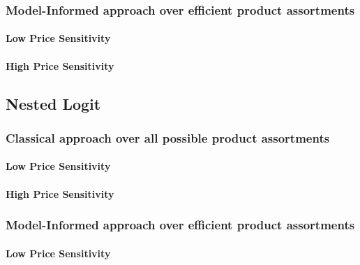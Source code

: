 

\subsubsection{Model-Informed approach over efficient product assortments}

\paragraph{Low Price Sensitivity}



\paragraph{High Price Sensitivity}



\subsection{Nested Logit}

\subsubsection{Classical approach over all possible product assortments}

\paragraph{Low Price Sensitivity}



\paragraph{High Price Sensitivity}



\subsubsection{Model-Informed approach over efficient product assortments}

\paragraph{Low Price Sensitivity}

